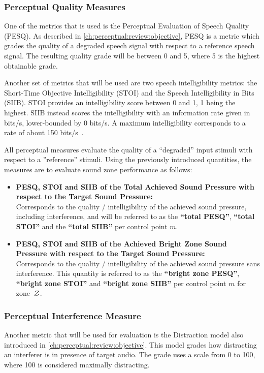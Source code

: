 \subsubsection{Perceptual Quality Measures}
One of the metrics that is used is the Perceptual Evaluation of Speech Quality (PESQ).
As described in \autoref{ch:perceptual:review:objective}, PESQ is a metric which grades the quality of a 
degraded speech signal with respect to a reference speech signal.
The resulting quality grade will be between 0 and 5, where 5 is the highest obtainable grade.

Another set of metrics that will be used are two speech intelligibility metrics: 
the Short-Time Objective Intelligibility (STOI) and 
the Speech Intelligibility in Bits (SIIB).
STOI provides an intelligibility score between 0 and 1, 1 being the highest.
SIIB instead scores the intelligibility with an information rate given in bits/s, lower-bounded by 0 bits/s.
A maximum intelligibility corresponds to a rate of about 150 bits/s~\cite{van2017instrumental}.

All perceptual measures evaluate the quality of a ``degraded'' input stimuli with respect to a ''reference'' stimuli.
Using the previously introduced quantities, the measures are to evaluate sound zone performance as follows:
\begin{itemize}
    \item \textbf{PESQ, STOI and SIIB of the Total Achieved Sound Pressure with 
        respect to the Target Sound Pressure:}\\
        Corresponds to the quality / intelligibility of the achieved sound pressure,
        including interference, and will be referred 
        to as the \textbf{``total PESQ''}, \textbf{``total STOI''} and the \textbf{``total SIIB''} per control point $m$. 
    \item \textbf{PESQ, STOI and SIIB of the Achieved Bright Zone Sound Pressure with 
        respect to the Target Sound Pressure:}\\
        Corresponds to the quality / intelligibility of the achieved sound pressure sans interference.
        This quantity is referred to as the \textbf{``bright zone PESQ''}, \textbf{``bright zone STOI''} and \textbf{``bright zone SIIB''}
        per control point $m$ for zone~$\mathcal{Z}$.
\end{itemize}

\subsubsection{Perceptual Interference Measure}
Another metric that will be used for evaluation is the Distraction model also introduced in \autoref{ch:perceptual:review:objective}.
This model grades how distracting an interferer is in presence of target audio.
The grade uses a scale from 0 to 100, where 100 is considered maximally distracting.


